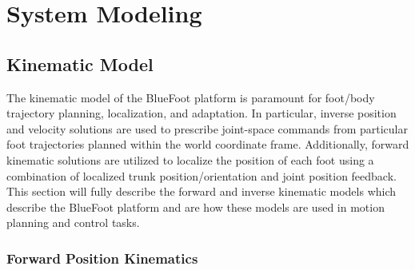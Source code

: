 \chapter{System Modeling}
\label{ch::system_modeling}

	
	\section{Kinematic Model}
	\label{sec::system_kinematics}

		The kinematic model of the BlueFoot platform is paramount for foot/body trajectory planning, localization, and adaptation. In particular, inverse position and velocity solutions are used to prescribe joint-space commands from particular foot trajectories planned within the world coordinate frame. Additionally, forward kinematic solutions are utilized to localize the position of each foot using a combination of localized trunk position/orientation and joint position feedback. This section will fully describe the forward and inverse kinematic models which describe the BlueFoot platform and are how these models are used in motion planning and control tasks.

		\subsection{Forward Position Kinematics}
		\label{ch::system_modeling_pos_kin}

